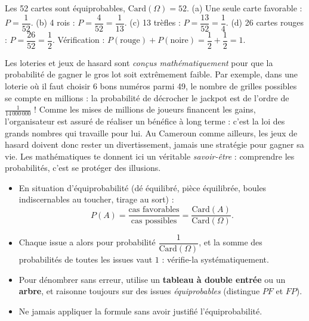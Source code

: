 \documentclass[11pt]{article}
\newcommand{\cle}[1]{{\popxbold\color{popdark}#1}}
\begin{document}
\begin{corrige}
Les 52 cartes sont équiprobables, $\mathrm{Card}(\Omega) = 52$.
(a) Une seule carte favorable : $P = \dfrac{1}{52}$.
(b) 4 rois : $P = \dfrac{4}{52} = \dfrac{1}{13}$.
(c) 13 trèfles : $P = \dfrac{13}{52} = \dfrac{1}{4}$.
(d) 26 cartes rouges : $P = \dfrac{26}{52} = \dfrac{1}{2}$.
Vérification : $P(\text{rouge}) + P(\text{noire}) = \dfrac{1}{2} + \dfrac{1}{2} = 1$.
\end{corrige}

\begin{savaistu}
Les loteries et jeux de hasard sont \emph{conçus mathématiquement} pour que la probabilité de gagner le gros lot soit extrêmement faible. Par exemple, dans une loterie où il faut choisir 6 bons numéros parmi 49, le nombre de grilles possibles se compte en millions : la probabilité de décrocher le jackpot est de l'ordre de $\frac{1}{14\,000\,000}$ ! Comme les mises de millions de joueurs financent les gains, l'organisateur est assuré de réaliser un bénéfice à long terme : c'est la loi des grands nombres qui travaille pour lui. Au Cameroun comme ailleurs, les jeux de hasard doivent donc rester un divertissement, jamais une stratégie pour gagner sa vie. Les mathématiques te donnent ici un véritable \emph{savoir-être} : comprendre les probabilités, c'est se protéger des illusions.
\end{savaistu}

\begin{aretenir}
\begin{itemize}
\item En situation d'\cle{équiprobabilité} (dé équilibré, pièce équilibrée, boules indiscernables au toucher, tirage au sort) :
\[
P(A) = \frac{\text{cas favorables}}{\text{cas possibles}} = \frac{\mathrm{Card}(A)}{\mathrm{Card}(\Omega)}.
\]
\item Chaque issue a alors pour probabilité $\dfrac{1}{\mathrm{Card}(\Omega)}$, et la somme des probabilités de toutes les issues vaut $1$ : vérifie-la systématiquement.
\item Pour dénombrer sans erreur, utilise un \textbf{tableau à double entrée} ou un \textbf{arbre}, et raisonne toujours sur des issues \emph{équiprobables} (distingue $PF$ et $FP$).
\item Ne jamais appliquer la formule sans avoir justifié l'équiprobabilité.
\end{itemize}
\end{aretenir}
\end{document}
